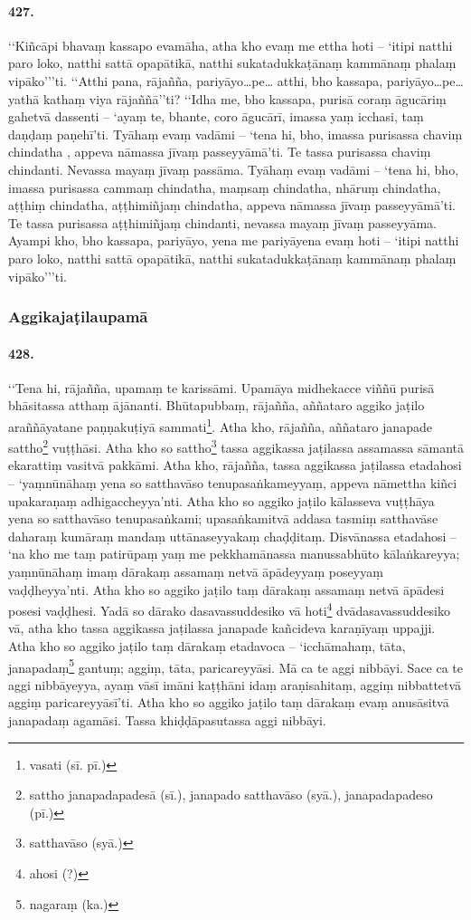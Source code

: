 \paragraph{427.} ‘‘Kiñcāpi bhavaṃ kassapo evamāha, atha kho evaṃ me ettha hoti – ‘itipi natthi paro loko, natthi sattā opapātikā, natthi sukatadukkaṭānaṃ kammānaṃ phalaṃ vipāko’’’ti. ‘‘Atthi pana, rājañña, pariyāyo…pe… atthi, bho kassapa, pariyāyo…pe… yathā kathaṃ viya rājaññā’’ti? ‘‘Idha me, bho kassapa, purisā coraṃ āgucāriṃ gahetvā dassenti – ‘ayaṃ te, bhante, coro āgucārī, imassa yaṃ icchasi, taṃ daṇḍaṃ paṇehī’ti. Tyāhaṃ evaṃ vadāmi – ‘tena hi, bho, imassa purisassa chaviṃ chindatha , appeva nāmassa jīvaṃ passeyyāmā’ti. Te tassa purisassa chaviṃ chindanti. Nevassa mayaṃ jīvaṃ passāma. Tyāhaṃ evaṃ vadāmi – ‘tena hi, bho, imassa purisassa cammaṃ chindatha, maṃsaṃ chindatha, nhāruṃ chindatha, aṭṭhiṃ chindatha, aṭṭhimiñjaṃ chindatha, appeva nāmassa jīvaṃ passeyyāmā’ti. Te tassa purisassa aṭṭhimiñjaṃ chindanti, nevassa mayaṃ jīvaṃ passeyyāma. Ayampi kho, bho kassapa, pariyāyo, yena me pariyāyena evaṃ hoti – ‘itipi natthi paro loko, natthi sattā opapātikā, natthi sukatadukkaṭānaṃ kammānaṃ phalaṃ vipāko’’’ti.

\subsubsection{Aggikajaṭilaupamā}

\paragraph{428.} ‘‘Tena hi, rājañña, upamaṃ te karissāmi. Upamāya midhekacce viññū purisā bhāsitassa atthaṃ ājānanti. Bhūtapubbaṃ, rājañña, aññataro aggiko jaṭilo araññāyatane paṇṇakuṭiyā sammati\footnote{vasati (sī. pī.)}. Atha kho, rājañña, aññataro janapade sattho\footnote{sattho janapadapadesā (sī.), janapado satthavāso (syā.), janapadapadeso (pī.)} vuṭṭhāsi. Atha kho so sattho\footnote{satthavāso (syā.)} tassa aggikassa jaṭilassa assamassa sāmantā ekarattiṃ vasitvā pakkāmi. Atha kho, rājañña, tassa aggikassa jaṭilassa etadahosi – ‘yaṃnūnāhaṃ yena so satthavāso tenupasaṅkameyyaṃ, appeva nāmettha kiñci upakaraṇaṃ adhigaccheyya’nti. Atha kho so aggiko jaṭilo kālasseva vuṭṭhāya yena so satthavāso tenupasaṅkami; upasaṅkamitvā addasa tasmiṃ satthavāse daharaṃ kumāraṃ mandaṃ uttānaseyyakaṃ chaḍḍitaṃ. Disvānassa etadahosi – ‘na kho me taṃ patirūpaṃ yaṃ me pekkhamānassa manussabhūto kālaṅkareyya; yaṃnūnāhaṃ imaṃ dārakaṃ assamaṃ netvā āpādeyyaṃ poseyyaṃ vaḍḍheyya’nti. Atha kho so aggiko jaṭilo taṃ dārakaṃ assamaṃ netvā āpādesi posesi vaḍḍhesi. Yadā so dārako dasavassuddesiko vā hoti\footnote{ahosi (?)} dvādasavassuddesiko vā, atha kho tassa aggikassa jaṭilassa janapade kañcideva karaṇīyaṃ uppajji. Atha kho so aggiko jaṭilo taṃ dārakaṃ etadavoca – ‘icchāmahaṃ, tāta, janapadaṃ\footnote{nagaraṃ (ka.)} gantuṃ; aggiṃ, tāta, paricareyyāsi. Mā ca te aggi nibbāyi. Sace ca te aggi nibbāyeyya, ayaṃ vāsī imāni kaṭṭhāni idaṃ araṇisahitaṃ, aggiṃ nibbattetvā aggiṃ paricareyyāsī’ti. Atha kho so aggiko jaṭilo taṃ dārakaṃ evaṃ anusāsitvā janapadaṃ agamāsi. Tassa khiḍḍāpasutassa aggi nibbāyi.


